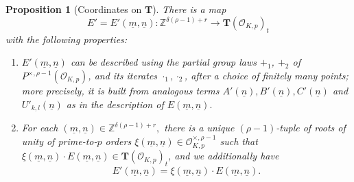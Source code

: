 \documentclass[11pt,oneside]{amsart}
\theoremstyle{plain}
\newtheorem{proposition}[theorem]{Proposition}
\theoremstyle{definition}
\def\TT{\mathbf{T}}
\def\Z{\mathbb{Z}}
\def\oh{\mathcal{O}}
\begin{document}
\begin{proposition}[Coordinates on $\TT$]\label{prop:modify-E-by-local-units}
There is a map 
$$E'=E'(\underline{m}, \underline{n}): \Z^{\delta(\rho-1)+r} \longrightarrow \TT(\oh_{K, p})_t$$ with the following properties:
\begin{enumerate}
\item{$E'(\underline{m}, \underline{n})$ can be described using the partial group laws $+_1$, $+_2$ of $P^{\times, \rho-1}(\oh_{K, p})$, and its iterates $\cdot_1, \cdot_2$, after a choice of finitely many points; more precisely, it is built from analogous terms $A'(\underline{n}), B'(\underline{n}), C'(\underline{n})$ and $U'_{k, l}(\underline{n})$ as in the description of $E(\underline{m}, \underline{n}).$}
\item{For each $(\underline{m}, \underline{n}) \in \Z^{\delta(\rho-1)+r},$ there is a unique $(\rho-1)$-tuple of roots of unity of prime-to-$p$ orders $\xi(\underline{m},\underline{n}) \in \oh_{K, p}^{\times, \rho-1}$ such that $\xi(\underline{m}, \underline{n})\cdot E(\underline{m}, \underline{n}) \in \TT(\oh_{K, p})_t$, and we additionally have $$E'(\underline{m}, \underline{n})=\xi(\underline{m}, \underline{n})\cdot E(\underline{m}, \underline{n}).$$}
\end{enumerate}
\end{proposition}
\end{document}
